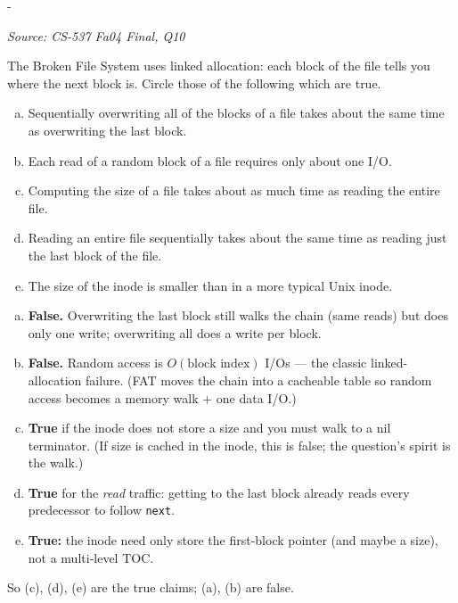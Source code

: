 \documentclass[11pt,a4paper]{article}
\makeatletter
\newcommand{\keepspace}[1]{\par\penalty-100\begingroup
  \setlength{\dimen@}{#1}\dimen@ii\pagegoal\advance\dimen@ii-\pagetotal
  \ifdim\dimen@>\dimen@ii\ifdim\dimen@ii>\z@\vfil\fi\break\fi\endgroup}
\newcounter{qn}[section]
\newenvironment{Qn}[4]{%
  \refstepcounter{qn}\keepspace{7\baselineskip}%
  \begin{tcolorbox}[qboxstyle, title={Q\thesection.\theqn\ \ [#1 \textbar\ #2]\ \ #4}]%
  {\footnotesize\color{g3}\textit{Source: #3}}\par\smallskip%
}{%
  \end{tcolorbox}%
}
\newenvironment{Sol}{%
  \begin{tcolorbox}[sboxstyle, title={Solution}]%
}{%
  \end{tcolorbox}\vspace{0.35em}%
}
\makeatother
\begin{document}
\begin{Qn}{Medium}{Lect 24}{CS-537 Fa04 Final, Q10}{Linked allocation: which claims are true?}
The Broken File System uses linked allocation: each block of the file
tells you where the next block is. Circle those of the following which
are true.
\begin{enumerate}[(a)]
\item Sequentially overwriting all of the blocks of a file takes about
      the same time as overwriting the last block.
\item Each read of a random block of a file requires only about one I/O.
\item Computing the size of a file takes about as much time as reading
      the entire file.
\item Reading an entire file sequentially takes about the same time as
      reading just the last block of the file.
\item The size of the inode is smaller than in a more typical Unix
      inode.
\end{enumerate}
\end{Qn}
\begin{Sol}
\begin{enumerate}[(a)]
\item \textbf{False.} Overwriting the last block still walks the chain
      (same reads) but does only one write; overwriting all does a
      write per block.
\item \textbf{False.} Random access is $O(\text{block index})$ I/Os ---
      the classic linked-allocation failure. (FAT moves the chain into
      a cacheable table so random access becomes a memory walk $+$ one
      data I/O.)
\item \textbf{True} if the inode does not store a size and you must
      walk to a nil terminator. (If size is cached in the inode, this
      is false; the question's spirit is the walk.)
\item \textbf{True} for the \emph{read} traffic: getting to the last
      block already reads every predecessor to follow \texttt{next}.
\item \textbf{True:} the inode need only store the first-block pointer
      (and maybe a size), not a multi-level TOC.
\end{enumerate}
So (c), (d), (e) are the true claims; (a), (b) are false.
\end{Sol}
\end{document}
